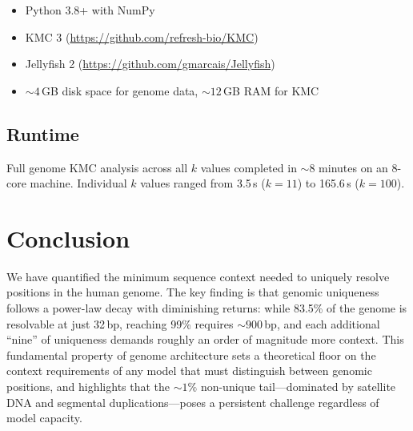 \documentclass[11pt,a4paper]{article}
\begin{document}
\begin{itemize}
    \item Python 3.8+ with NumPy
    \item KMC 3 (\url{https://github.com/refresh-bio/KMC})
    \item Jellyfish 2 (\url{https://github.com/gmarcais/Jellyfish})
    \item ${\sim}4$\,GB disk space for genome data, ${\sim}12$\,GB RAM for KMC
\end{itemize}

\subsection{Runtime}

Full genome KMC analysis across all $k$ values completed in ${\sim}8$ minutes on an 8-core machine. Individual $k$ values ranged from 3.5\,s ($k=11$) to 165.6\,s ($k=100$).

\section{Conclusion}

We have quantified the minimum sequence context needed to uniquely resolve positions in the human genome. The key finding is that genomic uniqueness follows a power-law decay with diminishing returns: while 83.5\% of the genome is resolvable at just 32\,bp, reaching 99\% requires ${\sim}900$\,bp, and each additional ``nine'' of uniqueness demands roughly an order of magnitude more context. This fundamental property of genome architecture sets a theoretical floor on the context requirements of any model that must distinguish between genomic positions, and highlights that the ${\sim}1\%$ non-unique tail---dominated by satellite DNA and segmental duplications---poses a persistent challenge regardless of model capacity.
\end{document}
